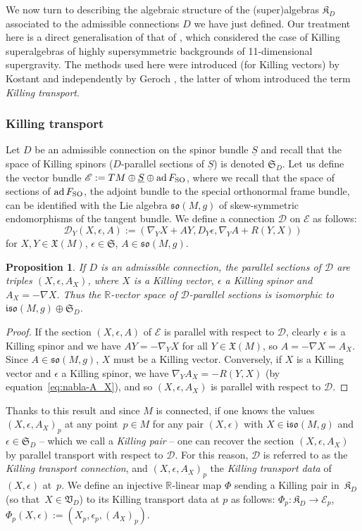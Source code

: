 \documentclass[pdftex]{sigma}
\numberwithin{equation}{section}
\newtheorem{Proposition}[Theorem]{Proposition}
 { \theoremstyle{definition}
\newtheorem{Definition}[Theorem]{Definition}
\newtheorem{Note}[Theorem]{Note}
\newtheorem{Example}[Theorem]{Example}
\newtheorem{Remark}[Theorem]{Remark} }
\newcommand{\fso}{\mathfrak{so}}
\newcommand{\fiso}{\mathfrak{iso}}
\newcommand{\fX}{\mathfrak{X}}
\newcommand{\fK}{\mathfrak{K}}
\newcommand{\fS}{\mathfrak{S}}
\newcommand{\fV}{\mathfrak{V}}
\newcommand{\RR}{\mathbb{R}}
\newcommand{\eD}{\mathscr{D}}
\newcommand{\eE}{\mathscr{E}}
\newcommand{\Sbundle}{\underline{S}}
\newcommand{\1}{\mathbbm{1}}
\DeclareMathOperator{\ad}{ad}
\begin{document}
We now turn to describing the algebraic structure of the (super)algebras $\fK_D$ associated to the admissible connections $D$ we have just defined. Our treatment here is a direct generalisation of that of \cite{Figueroa-OFarrill2017_1}, which considered the case of Killing superalgebras of highly supersymmetric backgrounds of 11-dimensional supergravity. The methods used here were introduced (for Killing vectors) by Kostant \cite{Kostant1955} and independently by Geroch \cite{Geroch1969}, the latter of whom introduced the term \emph{Killing transport}.

\subsubsection{Killing transport}

Let $D$ be an admissible connection on the spinor bundle $\Sbundle$ and recall that the space of Killing spinors ($D$-parallel sections of $\Sbundle$) is denoted $\fS_D$. Let us define the vector bundle
$\eE := TM\oplus\Sbundle\oplus\ad F_{\rm SO}$,
where we recall that the space of sections of $\ad F_{\rm SO}$, the adjoint bundle to the special orthonormal frame bundle, can be identified with the Lie algebra $\fso(M,g)$ of skew-symmetric endomorphisms of the tangent bundle. We define a connection $\eD$ on $\eE$ as follows:
\[
	\eD_Y(X,\epsilon,A) := (\nabla_Y X + AY,D_Y\epsilon,\nabla_Y A + R(Y,X))
\]
for $X,Y\in\fX(M)$, $\epsilon\in\fS$, $A\in\fso(M,g)$.

\begin{Proposition}\label{prop:killing-transport}
	If $D$ is an admissible connection, the parallel sections of $\eD$ are triples $(X,\epsilon,A_X)$, where $X$ is a Killing vector, $\epsilon$ a Killing spinor and $A_X=-\nabla X$. Thus the $\RR$-vector space of $\eD$-parallel sections is isomorphic to $\fiso(M,g)\oplus\fS_D$.
\end{Proposition}
\begin{proof}
If the section $(X,\epsilon,A)$ of $\eE$ is parallel with respect to $\eD$, clearly $\epsilon$ is a Killing spinor and we have $AY = -\nabla_Y X$ for all $Y\in\fX(M)$, so $A = -\nabla X = A_X$. Since $A\in\fso(M,g)$, $X$ must be a Killing vector. Conversely, if $X$ is a Killing vector and $\epsilon$ a Killing spinor, we have $\nabla_Y A_X = -R(Y,X)$ (by equation~\eqref{eq:nabla-A_X}), and so $(X,\epsilon,A_X)$ is parallel with respect to $\eD$.
\end{proof}

Thanks to this result and since $M$ is connected, if one knows the values $(X,\epsilon,A_X)_p$ at any point~${p\in M}$ for any pair $(X,\epsilon)$ with $X\in\fiso(M,g)$ and $\epsilon\in\fS_D$ -- which we call a \emph{Killing pair} -- one can recover the section $(X,\epsilon,A_X)$ by parallel transport with respect to $\eD$. For this reason, $\eD$ is referred to as the \emph{Killing transport connection}, and $(X,\epsilon,A_X)_p$ the \emph{Killing transport data} of~$(X,\epsilon)$ at~$p$. We define an injective $\RR$-linear map $\Phi$ sending a Killing pair in~$\fK_D$ (so that~${X\in\fV_D}$) to its Killing transport data at $p$ as follows:
$\Phi_p\colon \fK_D\to\eE_p$,
	$\Phi_p(X,\epsilon):=(X_p,\epsilon_p,(A_X)_p)$.
\end{document}
